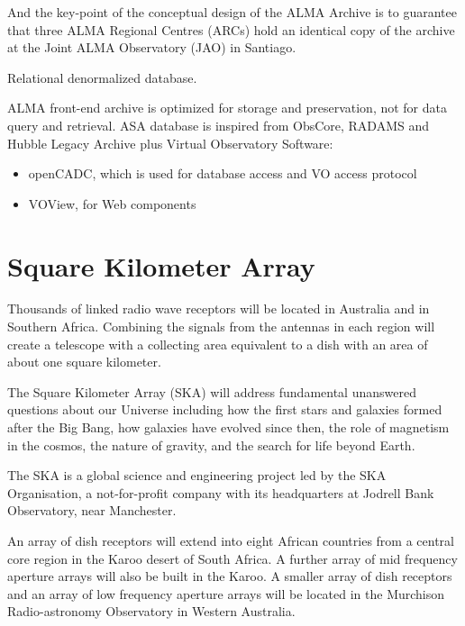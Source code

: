 And the key-point of the conceptual design of the ALMA Archive is to guarantee that three ALMA Regional Centres (ARCs) hold an identical copy of the archive at the Joint ALMA Observatory (JAO) in Santiago. 

Relational denormalized database.

ALMA front-end archive is optimized for storage and preservation, not for data query and retrieval. ASA database is inspired from ObsCore, RADAMS and Hubble Legacy Archive plus Virtual Observatory Software:

\begin{itemize}
\item openCADC, which is used for database access and VO access protocol
\item VOView, for Web components
\end{itemize}




\section{Square Kilometer Array}

Thousands of linked radio wave receptors will be located in Australia and in Southern Africa. Combining the signals from the antennas in each region will create a telescope with a collecting area equivalent to a dish with an area of about one square kilometer.  \newline

The Square Kilometer Array (SKA) will address fundamental unanswered questions about our Universe including how the first stars and galaxies formed after the Big Bang, how galaxies have evolved since then, the role of magnetism in the cosmos, the nature of gravity, and the search for life beyond Earth.  \newline

The SKA is a global science and engineering project led by the SKA Organisation, a not-for-profit company with its headquarters at Jodrell Bank Observatory, near Manchester.  \newline

An array of dish receptors will extend into eight African countries from a central core region in the Karoo desert of South Africa. A further array of mid frequency aperture arrays will also be built in the Karoo. A smaller array of dish receptors and an array of low frequency aperture arrays will be located in the Murchison Radio-astronomy Observatory in Western Australia. \newline

